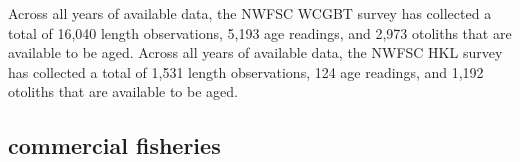 \documentclass[11pt,
  english,
  letterpaper,
]{article}
\begin{document}
Across all years of available data, the NWFSC WCGBT survey has collected a total of 16,040 length observations, 5,193 age readings, and 2,973 otoliths that are available to be aged. Across all years of available data, the NWFSC HKL survey has collected a total of 1,531 length observations, 124 age readings, and 1,192 otoliths that are available to be aged.

\leavevmode\tagmcend\tagstructend\par


\hypertarget{commercial-fisheries-60}{%
\subsection{commercial fisheries}\label{commercial-fisheries-60}}

\leavevmode\tagmcend\tagstructend


\begingroup\fontsize{10}{12}\selectfont \begingroup\fontsize{10}{12}\selectfont

\leavevmode\tagmcend\tagstructend\par
\end{document}
